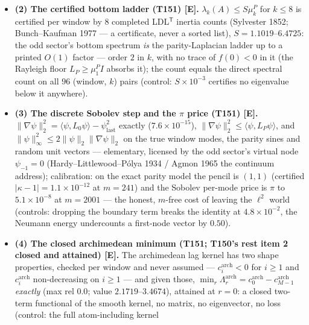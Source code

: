 \documentclass[11pt]{article}
\providecommand{\mE}{\textbf{[E]}}\providecommand{\mC}{\textbf{[C]}}
\begin{document}
\begin{itemize}[leftmargin=1.5em]
\emph{negatively}): the symbol-only pencil floor $\kappa_{\mathrm{sym}}(1-\rho)$ is vacuous
($\rho\ge1$) on $12/12$ windows and the symbol moves by $0.45$--$3.27$ relative across
\emph{one} mode spacing --- no pointwise symbol statement is admissible at the bottom mode's
resolution: the local model is a \emph{matrix} statement, not a symbol statement (controls:
the Dirichlet corner breaks the eigenpairs at $1.0$, a one-index shift misses by
$6.5\times10^{-3}$).
\item \textbf{(2) The certified bottom ladder (T151) \mE.} $\lambda_k(A)\le S\mu^P_k$ for
$k\le8$ is certified per window by $8$ completed LDL$^{\mathsf T}$ inertia counts (Sylvester
1852; Bunch--Kaufman 1977 --- a certificate, never a sorted list), $S=1.1019$--$6.4725$: the
odd sector's bottom spectrum \emph{is} the parity-Laplacian ladder up to a printed $O(1)$
factor --- order $2$ in $k$, with no trace of $f(0)<0$ in it (the Rayleigh floor
$L_P\ge\mu^P_1 I$ absorbs it); the count equals the direct spectral count on all $96$
(window, $k$) pairs (control: $S\times10^{-3}$ certifies no eigenvalue below it anywhere).
\item \textbf{(3) The discrete Sobolev step and the $\pi$ price (T151) \mE.}
$\|\nabla\psi\|_2^2=\langle\psi,L_0\psi\rangle-\psi_{\mathrm{last}}^2$ exactly
($7.6\times10^{-15}$), $\|\nabla\psi\|_2^2\le\langle\psi,L_P\psi\rangle$, and
$\|\psi\|_\infty^2\le2\|\psi\|_2\|\nabla\psi\|_2$ on the true window modes, the parity sines
and random unit vectors --- elementary, licensed by the odd sector's virtual node
$\psi_{-1}=0$ (Hardy--Littlewood--P\'olya 1934 / Agmon 1965 the continuum address);
calibration: on the exact parity model the pencil is $(1,1)$ (certified
$|\kappa-1|=1.1\times10^{-12}$ at $m=241$) and the Sobolev per-mode price is $\pi$ to
$5.1\times10^{-8}$ at $m=2001$ --- the honest, $m$-free cost of leaving the $\ell^2$ world
(controls: dropping the boundary term breaks the identity at $4.8\times10^{-2}$, the Neumann
energy undercounts a first-node vector by $0.50$).
\item \textbf{(4) The closed archimedean minimum (T151; T150's rest item 2 closed and
attained) \mE.} The archimedean lag kernel has two shape properties, checked per window and
never assumed --- $c^{\mathrm{arch}}_i<0$ for $i\ge1$ and $c^{\mathrm{arch}}_i$ non-decreasing
on $i\ge1$ --- and given those,
$\min_r\Lambda^{\mathrm{arch}}_r=c^{\mathrm{arch}}_0-c^{\mathrm{arch}}_{M-1}$ \emph{exactly}
(max rel $0.0$; value $2.1719$--$3.4674$), attained at $r=0$: a closed two-term functional of
the smooth kernel, no matrix, no eigenvector, no loss (control: the full atom-including kernel

\end{itemize}
\end{document}
